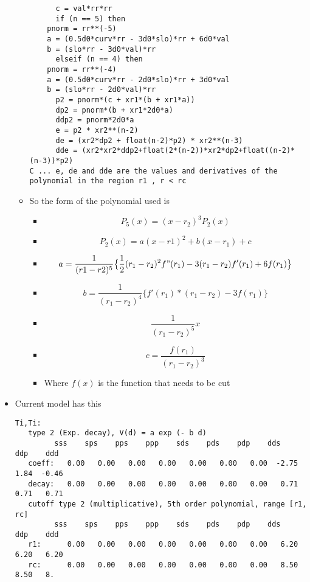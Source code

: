 \documentclass[11pt]{article}
\begin{document}
\begin{itemize}
\begin{itemize}
\begin{verbatim}
      c = val*rr*rr
      if (n == 5) then
	pnorm = rr**(-5)
	a = (0.5d0*curv*rr - 3d0*slo)*rr + 6d0*val
	b = (slo*rr - 3d0*val)*rr
      elseif (n == 4) then
	pnorm = rr**(-4)
	a = (0.5d0*curv*rr - 2d0*slo)*rr + 3d0*val
	b = (slo*rr - 2d0*val)*rr
      p2 = pnorm*(c + xr1*(b + xr1*a))
      dp2 = pnorm*(b + xr1*2d0*a)
      ddp2 = pnorm*2d0*a
      e = p2 * xr2**(n-2)
      de = (xr2*dp2 + float(n-2)*p2) * xr2**(n-3)
      dde = (xr2*xr2*ddp2+float(2*(n-2))*xr2*dp2+float((n-2)*(n-3))*p2)
C ... e, de and dde are the values and derivatives of the polynomial in the region r1 , r < rc
\end{verbatim}
\item So the form of the polynomial used is
\begin{itemize}
\item $$ P_5(x) = (x-r_2)^3 P_2(x)  $$
\item \[ P_2(x) = a(x-r1)^2 + b(x-r_1) + c \]
\item \[ a = \frac{1}{ (r1-r2)^5 } \big\{  \frac{1}{2}(r_1-r_2)^2f"(r_1) -3(r_1-r_2)f'(r_1) + 6f(r_1) \big\} \]
\item \[  b = \frac{1}{(r_1-r_2)^4} \big\{ f'(r_1)*(r_1-r_2) - 3f(r_1) \big\}  \]
\item \[ \frac{1}{(r_1 - r_2)^5} x \]
\item \[  c = \frac{ f(r_1) }{ (r_1-r_2)^3} \]
\item Where \(f(x)\) is the function that needs to be cut
\end{itemize}
\end{itemize}
\item Current model has this
\begin{verbatim}
Ti,Ti:
   type 2 (Exp. decay), V(d) = a exp (- b d)
	     sss    sps    pps    ppp    sds    pds    pdp    dds    ddp    ddd
   coeff:   0.00   0.00   0.00   0.00   0.00   0.00   0.00  -2.75   1.84  -0.46
   decay:   0.00   0.00   0.00   0.00   0.00   0.00   0.00   0.71   0.71   0.71
   cutoff type 2 (multiplicative), 5th order polynomial, range [r1, rc]
	     sss    sps    pps    ppp    sds    pds    pdp    dds    ddp    ddd
   r1:      0.00   0.00   0.00   0.00   0.00   0.00   0.00   6.20   6.20   6.20
   rc:      0.00   0.00   0.00   0.00   0.00   0.00   0.00   8.50   8.50   8.

\end{verbatim}
\end{itemize}
\end{document}
